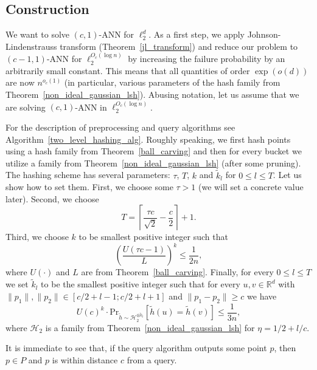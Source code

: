\documentclass[11pt,letterpaper]{article}
\newcommand{\Rbb}{\mathbb{R}}
\begin{document}
\subsection*{Construction}

We want to solve $(c, 1)$-ANN for $\ell_2^d$.
As a first step, we apply Johnson-Lindenstrauss transform (Theorem~\ref{jl_transform})
and reduce our problem to $(c - 1, 1)$-ANN for $\ell_2^{O_{c}(\log n)}$
by increasing the failure probability by an arbitrarily small constant.
This means that all quantities of order $\exp(o(d))$ are now $n^{o_c(1)}$
(in particular, various parameters of the hash family from Theorem~\ref{non_ideal_gaussian_lsh}).
Abusing notation, let us assume that we are solving $(c, 1)$-ANN in $\ell_2^{O_c(\log n)}$.

For the description of preprocessing and query algorithms see Algorithm~\ref{two_level_hashing_alg}.
Roughly speaking, we first hash points using a hash family from Theorem~\ref{ball_carving}
and then for every bucket we utilize a family from Theorem~\ref{non_ideal_gaussian_lsh} (after some pruning).
The hashing scheme has several parameters: $\tau$, $T$, $k$ and $\widetilde{k}_l$ for $0 \leq l \leq T$. Let us show how to set them.
First, we choose some $\tau > 1$ (we will set a concrete value later).
Second, we choose
\begin{equation}
    \label{choice_t}
    T = \left\lceil \frac{\tau c}{\sqrt{2}} - \frac{c}{2} \right\rceil + 1.
\end{equation}
Third, we choose $k$ to be smallest positive integer such that
\begin{equation}
    \label{choice_k}
    \left(\frac{U(\tau c - 1)}{L}\right)^k \leq \frac{1}{2n},
\end{equation}
where $U(\cdot)$ and $L$ are from Theorem~\ref{ball_carving}.
Finally, for every $0 \leq l \leq T$ we set $\widetilde{k}_l$ to be the smallest positive integer such that
for every $u, v \in \Rbb^d$ with $\|p_1\|, \|p_2\| \in \left[c / 2 + l - 1; c/2 + l + 1\right]$ and $\|p_1 - p_2\| \geq c$
we have
\begin{equation}
    \label{choice_kl}
    U(c)^{k} \cdot \mathrm{Pr}_{\widetilde{h} \sim \mathcal{H}_2^{\otimes \widetilde{k}_l}}\left[\widetilde{h}(u) = \widetilde{h}(v)\right] \leq \frac{1}{3n},
\end{equation}
where $\mathcal{H}_2$ is a family from Theorem~\ref{non_ideal_gaussian_lsh} for $\eta = 1/2 + l/c$.

It is immediate to see that, if the query algorithm outputs some point $p$, then $p \in P$ and $p$ is within distance $c$ from a query.
\end{document}
